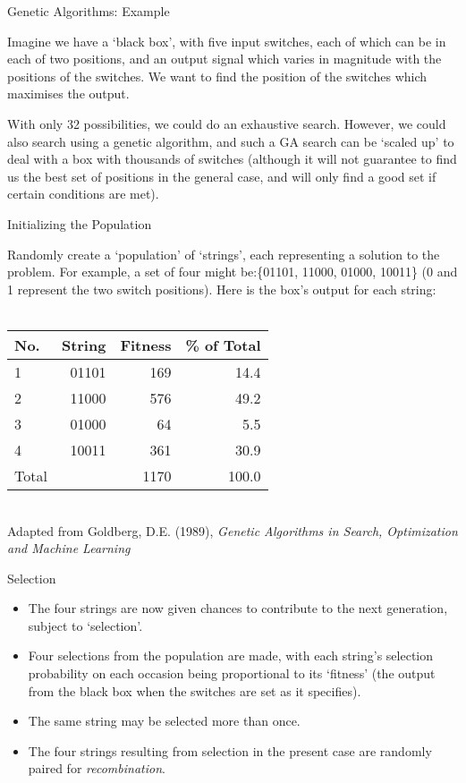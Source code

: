 \documentclass{article}
\begin{document}
\begin{slide}{}
{\Large Genetic Algorithms: Example}

Imagine we have a `black box', with five input switches, each of which
can be in each of two positions, and an output signal which varies in
magnitude with the positions of the switches. We want to find the
position of the switches which maximises the output.

With only 32
possibilities, we could do an exhaustive search. However, we could
also search using a genetic algorithm, and such a GA search can be `scaled
up' to deal with a box with thousands of switches (although it will
not guarantee to find us the best set of positions in the general
case, and will only find a good set if certain conditions are met).
\end{slide}

\begin{slide}{}
{\Large Initializing the Population}

Randomly create a `population' of `strings', each
representing a solution to the problem. For example,
a set of four might be:\{01101, 11000, 01000,
10011\} (0 and 1 represent the two switch positions). 
Here is the box's output for each string:\\ \ \\\begin{tabular}{||l|r|r|r||}\hline
No. & String & Fitness & \% of Total\\ \hline
1 & 01101 & 169 & 14.4\\2 & 11000 & 576 & 49.2\\3 & 01000 & 64 & 5.5\\4 & 10011 & 361 & 30.9\\ \hline
Total & & 1170 & 100.0\\ \hline
\end{tabular}\\{\tiny Adapted from Goldberg, D.E. (1989), {\em Genetic Algorithms in Search,
Optimization and Machine Learning}}\\\end{slide}

\begin{slide}{}
{\Large Selection}
\begin{itemize}
\item The four strings are now given chances to
contribute to the next generation, subject to `selection'. 
\item Four
selections from the  population are made, with each string's selection
probability on each occasion being proportional to its
`fitness' (the output from the black
box when the switches are set as it specifies). 
\item The same
string may be selected more than once. 
\item The four strings resulting from selection in the present case are
randomly paired for {\em recombination}.
\end{itemize}
\end{slide}
\end{document}
